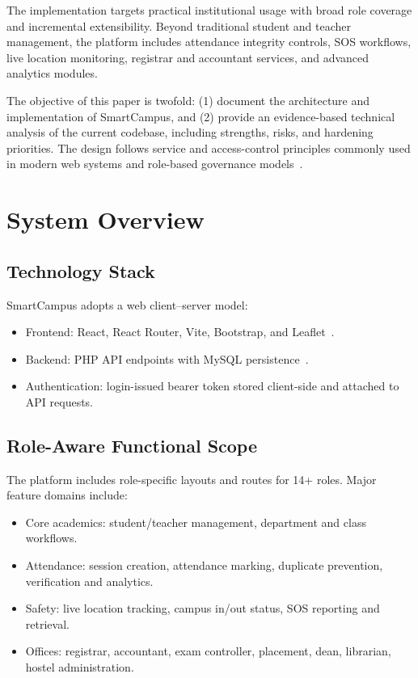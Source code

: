 \documentclass[conference]{IEEEtran}
\begin{document}
The implementation targets practical institutional usage with broad role coverage and incremental extensibility. Beyond traditional student and teacher management, the platform includes attendance integrity controls, SOS workflows, live location monitoring, registrar and accountant services, and advanced analytics modules.

The objective of this paper is twofold: (1) document the architecture and implementation of SmartCampus, and (2) provide an evidence-based technical analysis of the current codebase, including strengths, risks, and hardening priorities. The design follows service and access-control principles commonly used in modern web systems and role-based governance models~\cite{fowler_poeaa,fielding_rest,rbac_nist,owasp_top10}.

\section{System Overview}
\subsection{Technology Stack}
SmartCampus adopts a web client--server model:
\begin{itemize}
    \item Frontend: React, React Router, Vite, Bootstrap, and Leaflet~\cite{react_docs,vite_docs,leaflet_docs,bootstrap_docs}.
    \item Backend: PHP API endpoints with MySQL persistence~\cite{php_docs,mysql_docs}.
    \item Authentication: login-issued bearer token stored client-side and attached to API requests.
\end{itemize}

\subsection{Role-Aware Functional Scope}
The platform includes role-specific layouts and routes for 14+ roles. Major feature domains include:
\begin{itemize}
    \item Core academics: student/teacher management, department and class workflows.
    \item Attendance: session creation, attendance marking, duplicate prevention, verification and analytics.
    \item Safety: live location tracking, campus in/out status, SOS reporting and retrieval.
    \item Offices: registrar, accountant, exam controller, placement, dean, librarian, hostel administration.
\end{itemize}
\end{document}
